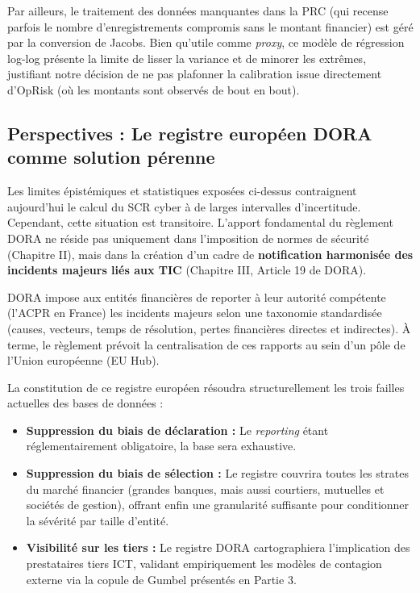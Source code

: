 \documentclass[11pt,a4paper]{article}
\theoremstyle{navystyle}
\theoremstyle{navydef}
\begin{document}
Par ailleurs, le traitement des données manquantes dans la PRC (qui recense parfois le nombre d'enregistrements compromis sans le montant financier) est géré par la conversion de Jacobs. Bien qu'utile comme \textit{proxy}, ce modèle de régression log-log présente la limite de \og lisser\fg{} la variance et de minorer les extrêmes, justifiant notre décision de ne pas plafonner la calibration issue directement d'OpRisk (où les montants sont observés de bout en bout).

\subsection{Perspectives : Le registre européen DORA comme solution pérenne}

Les limites épistémiques et statistiques exposées ci-dessus contraignent aujourd'hui le calcul du SCR cyber à de larges intervalles d'incertitude. Cependant, cette situation est transitoire. L'apport fondamental du règlement DORA ne réside pas uniquement dans l'imposition de normes de sécurité (Chapitre II), mais dans la création d'un cadre de \textbf{notification harmonisée des incidents majeurs liés aux TIC} (Chapitre III, Article 19 de DORA).

DORA impose aux entités financières de reporter à leur autorité compétente (l'ACPR en France) les incidents majeurs selon une taxonomie standardisée (causes, vecteurs, temps de résolution, pertes financières directes et indirectes). À terme, le règlement prévoit la centralisation de ces rapports au sein d'un pôle de l'Union européenne (EU Hub).

La constitution de ce registre européen résoudra structurellement les trois failles actuelles des bases de données :
\begin{itemize}
    \item \textbf{Suppression du biais de déclaration :} Le \textit{reporting} étant réglementairement obligatoire, la base sera exhaustive.
    \item \textbf{Suppression du biais de sélection :} Le registre couvrira toutes les strates du marché financier (grandes banques, mais aussi courtiers, mutuelles et sociétés de gestion), offrant enfin une granularité suffisante pour conditionner la sévérité par taille d'entité.
    \item \textbf{Visibilité sur les tiers :} Le registre DORA cartographiera l'implication des prestataires tiers ICT, validant empiriquement les modèles de contagion externe via la copule de Gumbel présentés en Partie 3.
\end{itemize}
\end{document}
